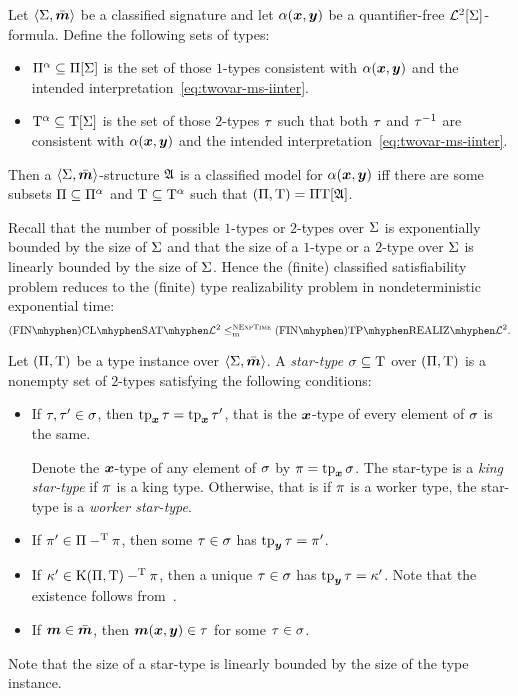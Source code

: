 \begin{remark}\label{rem:red-sat-to-real}
Let $\left\langle \mathrm{\Sigma},\bar{\bm{m}} \right\rangle$ be a classified signature and let $\alpha(\bm{x},\bm{y})$ be a
quantifier-free $\mathcal{L}^{2}[\mathrm{\Sigma}]$-formula.
Define the following sets of types:
\begin{itemize}
  \item $\Pi^\alpha \subseteq \Pi[\mathrm{\Sigma}]$ is the set of those $1$-types
  consistent with $\alpha(\bm{x},\bm{y})$ and the intended
  interpretation~\cref{eq:twovar-ms-iinter}.
  \item $\mathrm{T}^\alpha \subseteq \mathrm{T}[\mathrm{\Sigma}]$ is the set of those $2$-types $\tau$
  such that both $\tau$ and $\tau^{-1}$ are consistent with $\alpha(\bm{x},\bm{y})$
  and the intended interpretation~\cref{eq:twovar-ms-iinter}.
\end{itemize}
Then a $\left\langle \mathrm{\Sigma},\bar{\bm{m}} \right\rangle$-structure $\mathfrak{A}$ is a classified model for
$\alpha(\bm{x},\bm{y})$ iff there are some subsets $\Pi \subseteq \Pi^\alpha$ and
$\mathrm{T} \subseteq \mathrm{T}^\alpha$ such that  $(\Pi,\mathrm{T}) = \Pi\mathrm{T}[\mathfrak{A}]$.

Recall that the number of possible $1$-types or $2$-types over $\mathrm{\Sigma}$ is
exponentially bounded by the size of $\mathrm{\Sigma}$ and that the size of a $1$-type or
a $2$-type over $\mathrm{\Sigma}$ is linearly bounded by the size of $\mathrm{\Sigma}$.
Hence the (finite) classified satisfiability problem reduces to the
(finite) type realizability problem in nondeterministic exponential time:
\[
  \FinAClSat{\vFo2} \red\cNExpTime \FinAReal{\vFo2}.
\]
\end{remark}

\begin{definition}
Let $(\Pi,\mathrm{T})$ be a type instance over $\left\langle \mathrm{\Sigma},\bar{\bm{m}} \right\rangle$.
A \emph{star-type} $\sigma \subseteq \mathrm{T}$ over $(\Pi,\mathrm{T})$ is a nonempty
set of $2$-types satisfying the following conditions:
\begin{itemize}
  \item[\condstpx]\label{cond:stpx}
  If $\tau, {\tau'} \in \sigma$, then $\operatorname{tp}_{\bm{x}}\tau = \operatorname{tp}_{\bm{x}}{\tau'}$, that is the
  $\bm{x}$-type of every element of $\sigma$ is the same.

  Denote the $\bm{x}$-type of any element of $\sigma$ by $\pi = \operatorname{tp}_{\bm{x}}\sigma$.
  The star-type is a \emph{king star-type} if $\pi$ is a king type.
  Otherwise, that is if $\pi$ is a worker type, the star-type is a
  \emph{worker star-type}.
  \item[\condstppy]\label{cond:stppy}
  If ${\pi'} \in \Pi -^{\mathrm{T}} \pi$, then some $\tau \in \sigma$ has
  $\operatorname{tp}_{\bm{y}}\tau = {\pi'}$.
  
  \item[\condstpky]\label{cond:stpky}
  If ${\kappa'} \in \mathrm{K}(\Pi,\mathrm{T}) -^{\mathrm{T}} \pi$, then a unique $\tau \in
  \sigma$ has $\operatorname{tp}_{\bm{y}}\tau = {\kappa'}$. Note that the existence follows
  from~.
  \item[\condstpm]\label{cond:stpm}
  If $\bm{m} \in \bar{\bm{m}}$, then $\bm{m}(\bm{x},\bm{y}) \in \tau$ for some $\tau \in \sigma$.
\end{itemize}
Note that the size of a star-type is linearly bounded by the size of the type
instance.
\end{definition}

